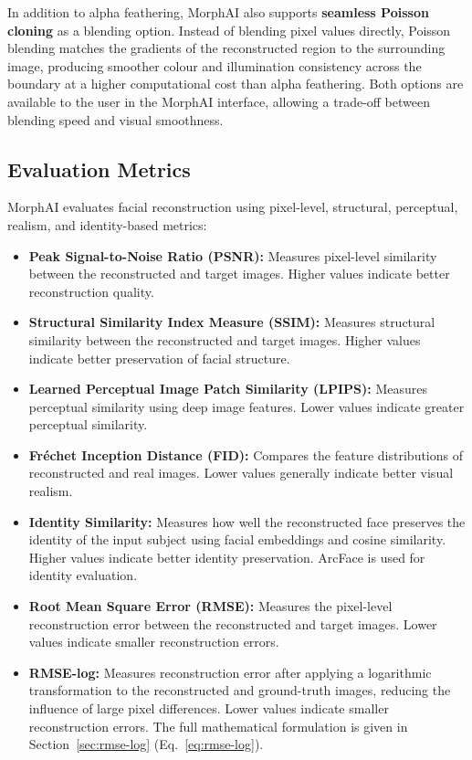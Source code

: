 \noindent In addition to alpha feathering, MorphAI also supports \textbf{seamless 
Poisson cloning} as a blending option. Instead of blending pixel values directly, 
Poisson blending matches the gradients of the reconstructed region to the 
surrounding image, producing smoother colour and illumination consistency across 
the boundary at a higher computational cost than alpha feathering. Both options 
are available to the user in the MorphAI interface, allowing a trade-off between 
blending speed and visual smoothness.

\subsection{Evaluation Metrics}

MorphAI evaluates facial reconstruction using pixel-level, structural,
perceptual, realism, and identity-based metrics:

\begin{itemize}

\item \textbf{Peak Signal-to-Noise Ratio (PSNR):} Measures pixel-level
similarity between the reconstructed and target images. Higher values
indicate better reconstruction quality.

\item \textbf{Structural Similarity Index Measure (SSIM):} Measures
structural similarity between the reconstructed and target images.
Higher values indicate better preservation of facial structure.

\item \textbf{Learned Perceptual Image Patch Similarity (LPIPS):}
Measures perceptual similarity using deep image features. Lower values
indicate greater perceptual similarity.

\item \textbf{Fréchet Inception Distance (FID):} Compares the feature
distributions of reconstructed and real images. Lower values generally
indicate better visual realism.

\item \textbf{Identity Similarity:} Measures how well the reconstructed
face preserves the identity of the input subject using facial embeddings
and cosine similarity. Higher values indicate better identity
preservation. ArcFace is used for identity evaluation.

\item \textbf{Root Mean Square Error (RMSE):} Measures the pixel-level
reconstruction error between the reconstructed and target images.
Lower values indicate smaller reconstruction errors.

\item \textbf{RMSE-log:} Measures reconstruction error after applying a
logarithmic transformation to the reconstructed and ground-truth images,
reducing the influence of large pixel differences. Lower values indicate
smaller reconstruction errors. The full mathematical formulation is given
in Section~\ref{sec:rmse-log} (Eq.~\ref{eq:rmse-log}).

\end{itemize}



